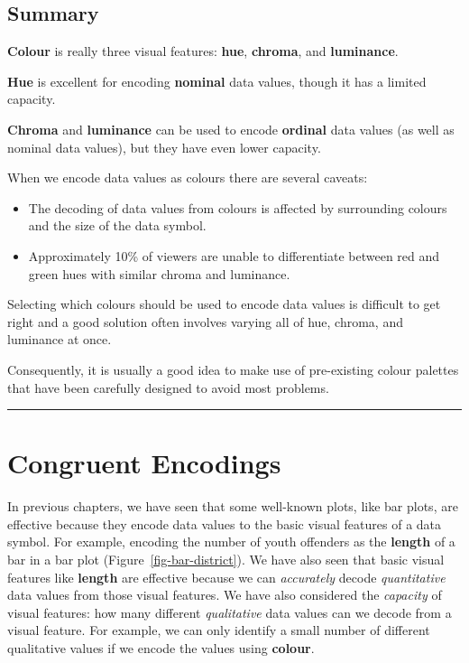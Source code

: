 \documentclass[
  letterpaper,
  DIV=11,
  numbers=noendperiod]{scrreprt}
\begin{document}
\section{Summary}\label{summary-5}

\textbf{Colour} is really three visual features: \textbf{hue},
\textbf{chroma}, and \textbf{luminance}.

\textbf{Hue} is excellent for encoding \textbf{nominal} data values,
though it has a limited capacity.

\textbf{Chroma} and \textbf{luminance} can be used to encode
\textbf{ordinal} data values (as well as nominal data values), but they
have even lower capacity.

When we encode data values as colours there are several caveats:

\begin{itemize}
\item
  The decoding of data values from colours is affected by surrounding
  colours and the size of the data symbol.
\item
  Approximately 10\% of viewers are unable to differentiate between red
  and green hues with similar chroma and luminance.
\end{itemize}

Selecting which colours should be used to encode data values is
difficult to get right and a good solution often involves varying all of
hue, chroma, and luminance at once.

Consequently, it is usually a good idea to make use of pre-existing
colour palettes that have been carefully designed to avoid most
problems.

\begin{center}\rule{0.5\linewidth}{0.5pt}\end{center}

\theendnotes


\chapter{Congruent Encodings}\label{sec-congruence}

In previous chapters, we have seen that some well-known plots, like bar
plots, are effective because they encode data values to the basic visual
features of a data symbol. For example, encoding the number of youth
offenders as the \textbf{length} of a bar in a bar plot
(Figure~\ref{fig-bar-district}). We have also seen that basic visual
features like \textbf{length} are effective because we can
\emph{accurately} decode \emph{quantitative} data values from those
visual features. We have also considered the \emph{capacity} of visual
features: how many different \emph{qualitative} data values can we
decode from a visual feature. For example, we can only identify a small
number of different qualitative values if we encode the values using
\textbf{colour}.
\end{document}
